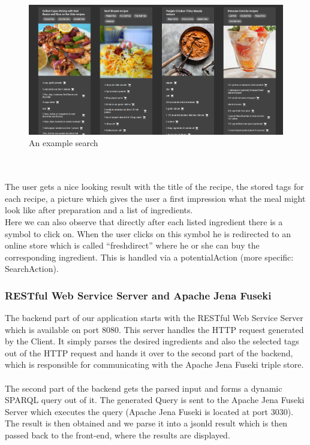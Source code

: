 \documentclass{article}
\begin{document}
\begin{figure}[H]
  \centering
  \includegraphics[width=14cm]{pictures/example_result.png}
  \caption{An example search}
  \label{fig:resp}
\end{figure}
\noindent
\\ \\
The user gets a nice looking result with the title of the recipe, the stored tags for each recipe, a picture which gives the user a first impression what the meal might look like after preparation and a list of ingredients. \\
Here we can also observe that directly after each listed ingredient there is a symbol to click on. When the user clicks on this symbol he is redirected to an online store which is called ``freshdirect'' where he or she can buy the corresponding ingredient. This is handled via a potentialAction (more specific: SearchAction).

\subsubsection{RESTful Web Service Server and Apache Jena Fuseki}
The backend part of our application starts with the RESTful Web Service Server which is available on port 8080. This server handles the HTTP request generated by the Client. It simply parses the desired ingredients and also the selected tags out of the HTTP request and hands it over to the second part of the backend, which is responsible for communicating with the Apache Jena Fuseki triple store. \\ \\
The second part of the backend gets the parsed input and forms a dynamic SPARQL query out of it. The generated Query is sent to the Apache Jena Fuseki Server which executes the query (Apache Jena Fuseki is located at port 3030). The result is then obtained and we parse it into a jsonld result which is then passed back to the front-end, where the results are displayed.\\
\end{document}
